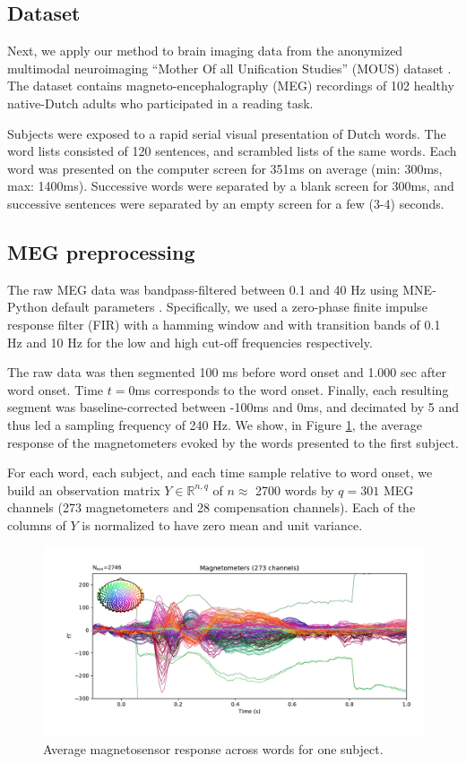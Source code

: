 \subsection{Dataset}

Next, we apply our method to brain imaging data from the anonymized multimodal
neuroimaging ``Mother Of all Unification Studies'' (MOUS) dataset \cite{schoffelen2019204}.
The dataset contains magneto-encephalography (MEG) recordings of 102 healthy native-Dutch
adults who participated in a reading task.

Subjects were exposed to a rapid serial visual presentation of Dutch words. The word lists
consisted of 120 sentences, and scrambled lists of the same words. Each word was presented on the computer screen for 351ms on average (min: 300ms, max: 1400ms).
Successive words were separated by a blank screen for 300ms, and successive
sentences were separated by an empty screen for a few (3-4) seconds.

\subsection{MEG preprocessing}

The raw MEG data was bandpass-filtered between 0.1 and 40 Hz using MNE-Python default
parameters \cite{mne}. Specifically, we used a zero-phase finite impulse response filter (FIR) with a hamming window and with transition bands of 0.1 Hz and 10 Hz for the low and high
cut-off frequencies respectively.

The raw data was then segmented 100 ms before word onset and 1.000 sec after
word onset. Time $t=0$ms corresponds to the word onset. Finally, each resulting segment was baseline-corrected between -100ms and 0ms, and decimated by 5 and thus led a sampling frequency of 240 Hz. We show, in Figure \ref{fig:megavg}, the average response of the
magnetometers evoked by the words presented to the first subject.

For each word, each subject, and each time sample relative to word onset, we build an observation matrix $Y \in \mathbb{R}^{n, q}$ of $n\approx$ 2700 words by $q=301$ MEG channels (273 magnetometers and 28 compensation channels). Each of the columns of $Y$ is normalized to have zero mean and unit variance.

\begin{figure}
  \centering
  \includegraphics[width=\textwidth, trim=1.5cm 1cm 0.5cm 0cm, clip=True]{figure_meg.pdf}
  \caption{Average magnetosensor response across words for one subject.}
  \label{fig:megavg}
\end{figure}

